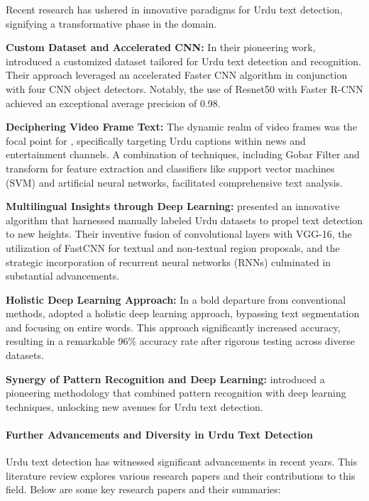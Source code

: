 Recent research has ushered in innovative paradigms for Urdu text detection, signifying a transformative phase in the domain.

\textbf{Custom Dataset and Accelerated CNN:} In their pioneering work, \cite{fastcnn} introduced a customized dataset tailored for Urdu text detection and recognition. Their approach leveraged an accelerated Faster CNN algorithm in conjunction with four CNN object detectors. Notably, the use of Resnet50 with Faster R-CNN achieved an exceptional average precision of 0.98.

\textbf{Deciphering Video Frame Text:} The dynamic realm of video frames was the focal point for \cite{urducaption}, specifically targeting Urdu captions within news and entertainment channels. A combination of techniques, including Gobar Filter and transform for feature extraction and classifiers like support vector machines (SVM) and artificial neural networks, facilitated comprehensive text analysis.

\textbf{Multilingual Insights through Deep Learning:} \cite{conv} presented an innovative algorithm that harnessed manually labeled Urdu datasets to propel text detection to new heights. Their inventive fusion of convolutional layers with VGG-16, the utilization of FastCNN for textual and non-textual region proposals, and the strategic incorporation of recurrent neural networks (RNNs) culminated in substantial advancements.

\textbf{Holistic Deep Learning Approach:} In a bold departure from conventional methods, \cite{urdu2021} adopted a holistic deep learning approach, bypassing text segmentation and focusing on entire words. This approach significantly increased accuracy, resulting in a remarkable 96\% accuracy rate after rigorous testing across diverse datasets.

\textbf{Synergy of Pattern Recognition and Deep Learning:} \cite{manzoor2021novel} introduced a pioneering methodology that combined pattern recognition with deep learning techniques, unlocking new avenues for Urdu text detection.



\paragraph{Further Advancements and Diversity in Urdu Text Detection} \hfill \break

Urdu text detection has witnessed significant advancements in recent years. This literature review explores various research papers and their contributions to this field. Below are some key research papers and their summaries:

